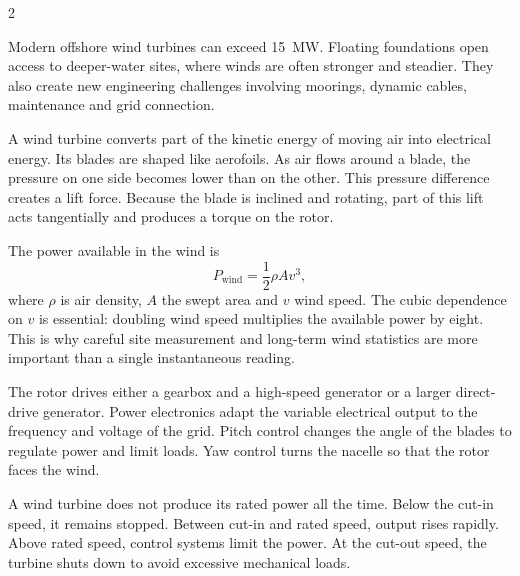 

\begin{multicols}{2}

\begin{engineeringnews}
Modern offshore wind turbines can exceed 15~MW. Floating foundations open access to deeper-water sites, where winds are often stronger and steadier. They also create new engineering challenges involving moorings, dynamic cables, maintenance and grid connection.
\end{engineeringnews}

\begin{ecarticle}
A wind turbine converts part of the kinetic energy of moving air into electrical energy. Its blades are shaped like aerofoils. As air flows around a blade, the pressure on one side becomes lower than on the other. This pressure difference creates a lift force. Because the blade is inclined and rotating, part of this lift acts tangentially and produces a torque on the rotor.

The power available in the wind is
\[
P_{\mathrm{wind}}=\frac{1}{2}\rho A v^3,
\]
where $\rho$ is air density, $A$ the swept area and $v$ wind speed. The cubic dependence on $v$ is essential: doubling wind speed multiplies the available power by eight. This is why careful site measurement and long-term wind statistics are more important than a single instantaneous reading.

The rotor drives either a gearbox and a high-speed generator or a larger direct-drive generator. Power electronics adapt the variable electrical output to the frequency and voltage of the grid. Pitch control changes the angle of the blades to regulate power and limit loads. Yaw control turns the nacelle so that the rotor faces the wind.

A wind turbine does not produce its rated power all the time. Below the cut-in speed, it remains stopped. Between cut-in and rated speed, output rises rapidly. Above rated speed, control systems limit the power. At the cut-out speed, the turbine shuts down to avoid excessive mechanical loads.
\end{ecarticle}


\end{multicols}
